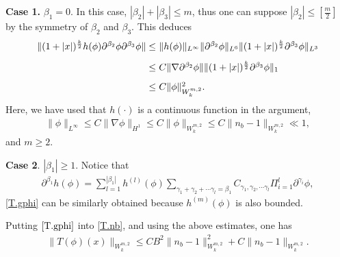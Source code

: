 \documentclass[11pt]{amsart}
\numberwithin{equation}{section}
\begin{document}
\textbf{Case 1.} $\beta_{1}=0$. In this case,
$|\beta_{2}|+|\beta_{3}|\leq m$, thus one can suppose
$|\beta_{2}|\leq [\frac{m}{2}]$ by the symmetry of $\beta_{2}$ and
$\beta_{3}$. This deduces
\begin{eqnarray*}
\arraycolsep=1.5pt
\begin{array}[b]{rl}
     \|(1+|x|)^{\frac{k}{2}}h(\phi)\partial^{\beta_2}\phi\partial^{\beta_3}\phi\|
\leq &
\|h(\phi)\|_{L^{\infty}}\|\partial^{\beta_2}\phi\|_{L^{6}}\|(1+|x|)^{\frac{k}{2}}\partial^{\beta_3}\phi\|_{L^{3}}\\[3mm]
\leq & C \|\nabla
\partial^{\beta_2}\phi\|\|(1+|x|)^{\frac{k}{2}}\partial^{\beta_3}\phi\|_{1}\\[3mm]
\leq & C \|\phi\|^2_{W^{m,2}_{k}}.
\end{array}
\end{eqnarray*}
Here, we have used that $h(\cdot)$ is  a continuous function in the
argument,
\begin{eqnarray*}
\|\phi\|_{L^{\infty}}\leq C\|\nabla \phi\|_{H^{1}}\leq
C\|\phi\|_{W^{m,2}_{k}}\leq C \|n_{b}-1\|_{W^{m,2}_{k}}\ll 1,
\end{eqnarray*}
and $m\geq 2$.

\textbf{Case 2}. $|\beta_{1}|\geq 1$. Notice that
\begin{eqnarray*}
\partial^{\beta_{1}}h(\phi)=\sum_{l=1}^{|\beta_{1}|}h^{(l)}(\phi)
\sum_{\gamma_{1}+\gamma_{2}+\cdots\gamma_{l}=\beta_{1}}
C_{\gamma_{1},\gamma_{2},\cdots\gamma_{l}}\Pi_{i=1}^{l}\partial^{\gamma_{i}}\phi,
\end{eqnarray*}
\eqref{T.gphi} can be similarly obtained because $h^{(m)}(\phi)$ is
also bounded.

Putting $\eqref{T.gphi}$ into \eqref{T.nb}, and using the above
estimates, one has
\begin{eqnarray}\label{T.phi.est}
\|T(\phi)(x)\|_{W^{m,2}_{k}}\leq C B^2
\|n_{b}-1\|_{W^{m,2}_{k}}^2+C\|n_{b}-1\|_{W^{m,2}_{k}}.
\end{eqnarray}
\end{document}
